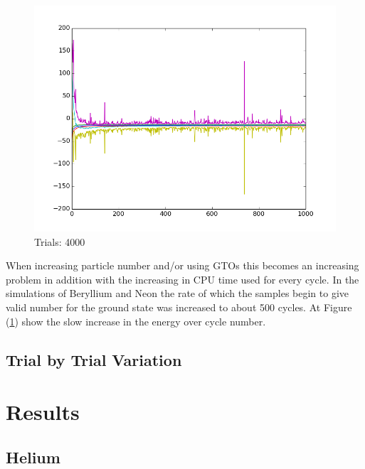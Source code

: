 \documentclass[twocolumn,fleqn,8pt]{article}  %
\begin{document}
\begin{figure}
	\includegraphics[width=\columnwidth]{../res/plot/beryllium_04/beryllium_04.png}
	\caption{Trials: 4000}
	\label{fig:beryllium_04}
\end{figure}
When increasing particle number and/or using GTOs this becomes an increasing problem
in addition with the increasing in CPU time used for every cycle. In the 
simulations of Beryllium and Neon the rate of which the samples begin to give
valid number for the ground state was increased to about 500 cycles. At 
Figure (\ref{fig:beryllium_04}) show the slow increase in the energy over cycle number. 

\subsection{Trial by Trial Variation}


\clearpage

\section{Results}
\subsection{Helium}
\end{document}
